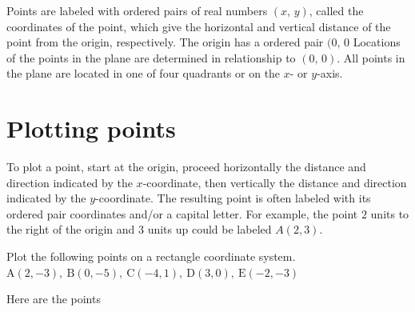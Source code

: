 Points are labeled with ordered pairs of real numbers $(x,\,y)$, called the coordinates of the point, which give the horizontal and vertical distance of the point from the origin, respectively. The origin has a ordered pair $(0,\, 0$ Locations of the points in the plane are determined in relationship to $(0,\,0)$. All points in the plane are located in one of four quadrants or on the $x$- or $y$-axis.
\section{Plotting points}
To plot a point, start at the origin, proceed horizontally the distance and direction indicated by the $x$-coordinate, then vertically the distance and direction indicated by the $y$-coordinate. The resulting point is often labeled with its ordered pair coordinates and/or a capital letter. For example, the point $2$ units to the right of the origin and $3$ units up could be labeled $A(2,3)$.
\begin{exa}
	Plot the following points on a rectangle coordinate system.
    $\text{A}(2, -3),\ \text{B}(0,-5),\ \text{C}(-4,1),\ \text{D}(3,0),\ \text{E}(-2,-3)$
\end{exa}
Here are the points
% 
\begin{figure}[h!tbp]
\centering
{}
\end{figure}
